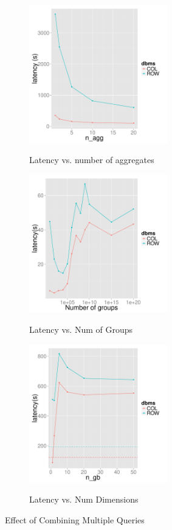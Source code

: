 \begin{figure}[t]
	\centering
	\begin{subfigure}{0.33\linewidth}
		{\includegraphics[width=6cm] {Images/multi_agg.pdf}}
		\caption{Latency vs. number of aggregates}
		\label{fig:multi_agg}
	\end{subfigure}
	\begin{subfigure}{0.33\linewidth}
		\centering
		{\includegraphics[width=6cm] {Images/multi_gb_same.pdf}}
		\caption{Latency vs. Num of Groups}
		\label{fig:multi_gb_same}
	\end{subfigure}
	\begin{subfigure}{0.33\linewidth}
		\centering
		{\includegraphics[width=6cm] {Images/multi_gb.pdf}}
		\caption{Latency vs. Num Dimensions}
		\label{fig:multi_gb_bp}
	\end{subfigure}
	\caption{Effect of Combining Multiple Queries }
	\label{fig:bank_perf}
\end{figure}

